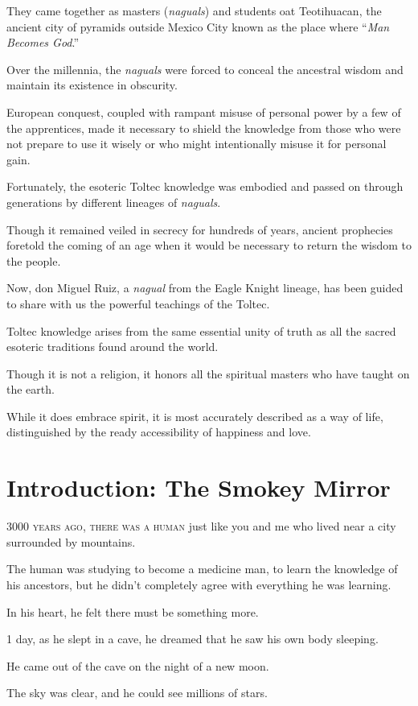 \documentclass{article}
\numberwithin{equation}{section}
\begin{document}
They came together as masters (\textit{naguals}) and students oat Teotihuacan, the ancient city of pyramids outside Mexico City known as the place where ``\textit{Man Becomes God}.''

%
Over the millennia, the \textit{naguals} were forced to conceal the ancestral wisdom and maintain its existence in obscurity.

European conquest, coupled with rampant misuse of personal power by a few of the apprentices, made it necessary to shield the knowledge from those who were not prepare to use it wisely or who might intentionally misuse it for personal gain.

%
Fortunately, the esoteric Toltec knowledge was embodied and passed on through generations by different lineages of \textit{naguals}.

Though it remained veiled in secrecy for hundreds of years, ancient prophecies foretold the coming of an age when it would be necessary to return the wisdom to the people.

Now, don Miguel Ruiz, a \textit{nagual} from the Eagle Knight lineage, has been guided to share with us the powerful teachings of the Toltec.

%
Toltec knowledge arises from the same essential unity of truth as all the sacred esoteric traditions found around the world.

Though it is not a religion, it honors all the spiritual masters who have taught on the earth.

While it does embrace spirit, it is most accurately described as a way of life, distinguished by the ready accessibility of happiness and love.

\section*{Introduction: The Smokey Mirror}
\textsc{3000 years ago, there was a human} just like you and me who lived near a city surrounded by mountains.

The human was studying to become a medicine man, to learn the knowledge of his ancestors, but he didn't completely agree with everything he was learning.

In his heart, he felt there must be something more.

%
1 day, as he slept in a cave, he dreamed that he saw his own body sleeping.

He came out of the cave on the night of a new moon.

The sky was clear, and he could see millions of stars.
\end{document}
